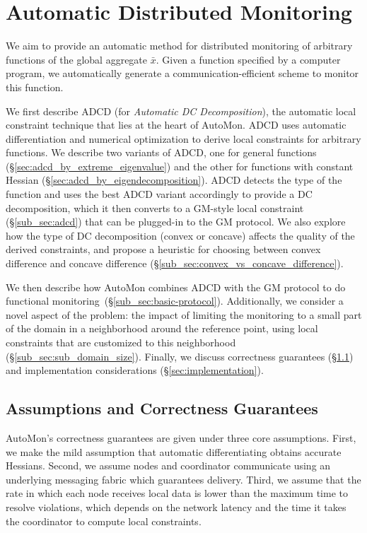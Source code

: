 \section{Automatic Distributed Monitoring} \label{sec:method}

We aim to provide an automatic method for distributed monitoring of arbitrary functions of the global aggregate $\bar{x}$.
Given a function specified by a computer program, we automatically generate a communication-efficient scheme to monitor this function.

We first describe ADCD (for \emph{Automatic DC Decomposition}), the automatic local constraint technique that lies at the heart of AutoMon.
ADCD uses automatic differentiation and numerical optimization to derive local constraints for arbitrary functions.
We describe two variants of ADCD, one for general functions (\S\ref{sec:adcd_by_extreme_eigenvalue}) and the other for functions with constant Hessian (\S\ref{sec:adcd_by_eigendecomposition}).
ADCD detects the type of the function and uses the best ADCD variant accordingly to provide a DC decomposition, which it then converts to a GM-style local constraint (\S\ref{sub_sec:adcd}) that can be plugged-in to the GM protocol.
%
We also explore how the type of DC decomposition (convex or concave)  affects the quality of the derived constraints, and propose a heuristic for choosing between convex difference and concave difference (\S\ref{sub_sec:convex_vs_concave_difference}). 

We then describe how AutoMon combines ADCD with the GM protocol to do functional monitoring~(\S\ref{sub_sec:basic-protocol}).
%
Additionally, we consider a novel aspect of the problem: the impact of limiting the monitoring to a small part of the domain in a neighborhood around the reference point, using local constraints that are customized to this neighborhood (\S\ref{sub_sec:sub_domain_size}).
%
Finally, we discuss correctness guarantees (\S\ref{sec:correctness_guarantees}) and implementation considerations (\S\ref{sec:implementation}).








\subsection{Assumptions and Correctness Guarantees}
\label{sec:correctness_guarantees}

AutoMon's correctness guarantees are given under three core assumptions.
First, we make the mild assumption that automatic differentiating obtains accurate Hessians.
Second, we assume nodes and coordinator communicate using an underlying messaging fabric which guarantees delivery.
Third, we assume that the rate in which each node receives local data is lower than the maximum time to resolve violations, which depends on the network latency and the time it takes the coordinator to compute local constraints.

